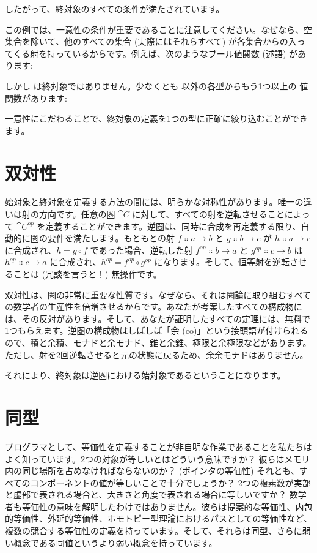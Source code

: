 したがって、終対象のすべての条件が満たされています。

この例では、一意性の条件が重要であることに注意してください。なぜなら、空集合を除いて、他のすべての集合 (実際にはそれらすべて) が各集合からの入ってくる射を持っているからです。例えば、次のようなブール値関数 (述語) があります:

しかし  は終対象ではありません。少なくとも  以外の各型からもう1つ以上の  値関数があります:

一意性にこだわることで、終対象の定義を1つの型に正確に絞り込むことができます。

\section{双対性}

始対象と終対象を定義する方法の間には、明らかな対称性があります。唯一の違いは射の方向です。任意の圏 $\cat{C}$ に対して、すべての射を逆転させることによって $\cat{C}^\mathit{op}$ を定義することができます。逆圏は、同時に合成を再定義する限り、自動的に圏の要件を満たします。もともとの射 $f \Colon a \to b$ と $g \Colon b \to c$ が $h \Colon a \to c$ に合成され、$h = g \circ f$ であった場合、逆転した射 $f^\mathit{op} \Colon b \to a$ と $g^\mathit{op} \Colon c \to b$ は $h^\mathit{op} \Colon c \to a$ に合成され、$h^\mathit{op} = f^\mathit{op} \circ g^\mathit{op}$ になります。そして、恒等射を逆転させることは (冗談を言うと！) 無操作です。

双対性は、圏の非常に重要な性質です。なぜなら、それは圏論に取り組むすべての数学者の生産性を倍増させるからです。あなたが考案したすべての構成物には、その反対があります。そして、あなたが証明したすべての定理には、無料で1つもらえます。逆圏の構成物はしばしば「余 (co)」という接頭語が付けられるので、積と余積、モナドと余モナド、錐と余錐、極限と余極限などがあります。ただし、射を2回逆転させると元の状態に戻るため、余余モナドはありません。

それにより、終対象は逆圏における始対象であるということになります。

\section{同型}

プログラマとして、等価性を定義することが非自明な作業であることを私たちはよく知っています。2つの対象が等しいとはどういう意味ですか？ 彼らはメモリ内の同じ場所を占めなければならないのか？ (ポインタの等価性) それとも、すべてのコンポーネントの値が等しいことで十分でしょうか？ 2つの複素数が実部と虚部で表される場合と、大きさと角度で表される場合に等しいですか？ 数学者も等価性の意味を解明したわけではありません。彼らは提案的な等価性、内包的等価性、外延的等価性、ホモトピー型理論におけるパスとしての等価性など、複数の競合する等価性の定義を持っています。そして、それらは同型、さらに弱い概念である同値というより弱い概念を持っています。

